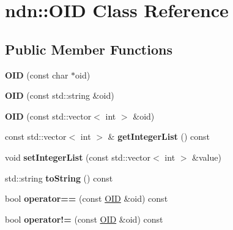 \hypertarget{classndn_1_1OID}{}\section{ndn\+:\+:O\+ID Class Reference}
\label{classndn_1_1OID}
\subsection*{Public Member Functions}
\begin{DoxyCompactItemize}
\item 
{\bfseries O\+ID} (const char $\ast$oid)\hypertarget{classndn_1_1OID_af6e2bbbcf013e2861e39f807452dbeb9}{}\label{classndn_1_1OID_af6e2bbbcf013e2861e39f807452dbeb9}

\item 
{\bfseries O\+ID} (const std\+::string \&oid)\hypertarget{classndn_1_1OID_a74557050ea38e5b3eadaff04313e9657}{}\label{classndn_1_1OID_a74557050ea38e5b3eadaff04313e9657}

\item 
{\bfseries O\+ID} (const std\+::vector$<$ int $>$ \&oid)\hypertarget{classndn_1_1OID_a68a9e6223093c25924bb44b16fabfcce}{}\label{classndn_1_1OID_a68a9e6223093c25924bb44b16fabfcce}

\item 
const std\+::vector$<$ int $>$ \& {\bfseries get\+Integer\+List} () const\hypertarget{classndn_1_1OID_ad39e39026c0c168a0bc9846a5060cbc8}{}\label{classndn_1_1OID_ad39e39026c0c168a0bc9846a5060cbc8}

\item 
void {\bfseries set\+Integer\+List} (const std\+::vector$<$ int $>$ \&value)\hypertarget{classndn_1_1OID_aefe4cf3896926e2493710c123aebf8a2}{}\label{classndn_1_1OID_aefe4cf3896926e2493710c123aebf8a2}

\item 
std\+::string {\bfseries to\+String} () const\hypertarget{classndn_1_1OID_ac5549f65518de7b808eb96ed8ac61422}{}\label{classndn_1_1OID_ac5549f65518de7b808eb96ed8ac61422}

\item 
bool {\bfseries operator==} (const \hyperlink{classndn_1_1OID}{O\+ID} \&oid) const\hypertarget{classndn_1_1OID_a6e6c9ccc78bcbb3ee17087bb1fd20c4e}{}\label{classndn_1_1OID_a6e6c9ccc78bcbb3ee17087bb1fd20c4e}

\item 
bool {\bfseries operator!=} (const \hyperlink{classndn_1_1OID}{O\+ID} \&oid) const\hypertarget{classndn_1_1OID_a8c11f7120d36537f8cba738ad9605b40}{}\label{classndn_1_1OID_a8c11f7120d36537f8cba738ad9605b40}


\end{DoxyCompactItemize}
